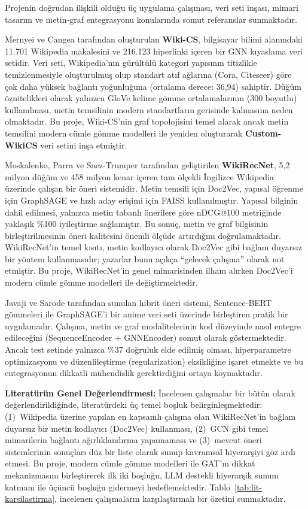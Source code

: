 \documentclass[12pt, a4paper]{article}
\begin{document}
Projenin doğrudan ilişkili olduğu üç uygulama çalışması, veri seti inşası, mimari tasarım ve metin-graf entegrasyonu konularında somut referanslar sunmaktadır.

Mernyei ve Cangea \cite{mernyei2020wikics} tarafından oluşturulan \textbf{Wiki-CS}, bilgisayar bilimi alanındaki 11.701 Wikipedia makalesini ve 216.123 hiperlinki içeren bir GNN kıyaslama veri setidir. Veri seti, Wikipedia'nın gürültülü kategori yapısının titizlikle temizlenmesiyle oluşturulmuş olup standart atıf ağlarına (Cora, Citeseer) göre çok daha yüksek bağlantı yoğunluğuna (ortalama derece: 36,94) sahiptir. Düğüm öznitelikleri olarak yalnızca GloVe kelime gömme ortalamalarının (300 boyutlu) kullanılması, metin temsilinin modern standartların gerisinde kalmasına neden olmaktadır. Bu proje, Wiki-CS'nin graf topolojisini temel alarak ancak metin temsilini modern cümle gömme modelleri ile yeniden oluşturarak \textbf{Custom-WikiCS} veri setini inşa etmiştir.

Moskalenko, Parra ve Saez-Trumper \cite{wikirecnet2020} tarafından geliştirilen \textbf{WikiRecNet}, 5,2 milyon düğüm ve 458 milyon kenar içeren tam ölçekli İngilizce Wikipedia üzerinde çalışan bir öneri sistemidir. Metin temsili için Doc2Vec, yapısal öğrenme için GraphSAGE ve hızlı aday erişimi için FAISS kullanılmıştır. Yapısal bilginin dahil edilmesi, yalnızca metin tabanlı önerilere göre nDCG@100 metriğinde yaklaşık \%100 iyileştirme sağlamıştır. Bu sonuç, metin ve graf bilgisinin birleştirilmesinin öneri kalitesini önemli ölçüde artırdığını doğrulamaktadır. WikiRecNet'in temel kısıtı, metin kodlayıcı olarak Doc2Vec gibi bağlam duyarsız bir yöntem kullanmasıdır; yazarlar bunu açıkça ``gelecek çalışma'' olarak not etmiştir. Bu proje, WikiRecNet'in genel mimarisinden ilham alırken Doc2Vec'i modern cümle gömme modelleri ile değiştirmektedir.

Javaji ve Sarode \cite{anime_hybrid_gnn_bert} tarafından sunulan hibrit öneri sistemi, Sentence-BERT gömmeleri ile GraphSAGE'i bir anime veri seti üzerinde birleştiren pratik bir uygulamadır. Çalışma, metin ve graf modalitelerinin kod düzeyinde nasıl entegre edileceğini (SequenceEncoder + GNNEncoder) somut olarak göstermektedir. Ancak test setinde yalnızca \%37 doğruluk elde edilmiş olması, hiperparametre optimizasyonu ve düzenlileştirme (regularization) eksikliğine işaret etmekte ve bu entegrasyonun dikkatli mühendislik gerektirdiğini ortaya koymaktadır.

\vspace{0.5em}
\noindent\textbf{Literatürün Genel Değerlendirmesi:}
İncelenen çalışmalar bir bütün olarak değerlendirildiğinde, literatürdeki üç temel boşluk belirginleşmektedir: (1)~Wikipedia üzerine yapılan en kapsamlı çalışma olan WikiRecNet'in bağlam duyarsız bir metin kodlayıcı (Doc2Vec) kullanması, (2)~GCN gibi temel mimarilerin bağlantı ağırlıklandırma yapamaması ve (3)~mevcut öneri sistemlerinin sonuçları düz bir liste olarak sunup kavramsal hiyerarşiyi göz ardı etmesi. Bu proje, modern cümle gömme modelleri ile GAT'ın dikkat mekanizmasını birleştirerek ilk iki boşluğu, LLM destekli hiyerarşik sunum katmanı ile üçüncü boşluğu gidermeyi hedeflemektedir. Tablo~\ref{tab:lit-karsilastirma}, incelenen çalışmaların karşılaştırmalı bir özetini sunmaktadır.
\end{document}
